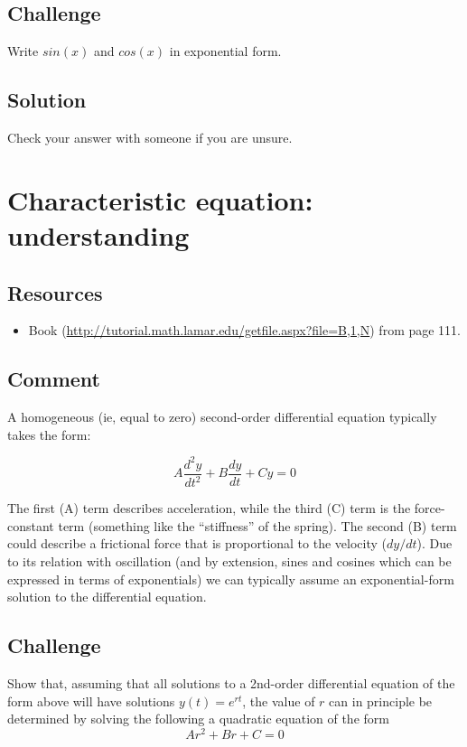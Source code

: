 \subsection*{Challenge}
Write $sin(x)$ and $cos(x)$ in exponential form.

\subsection*{Solution}

Check your answer with someone if you are unsure.


\timebox




\newpage
\section{Characteristic equation: understanding}

\subsection*{Resources}
\begin{itemize}
    \item Book (\url{http://tutorial.math.lamar.edu/getfile.aspx?file=B,1,N}) from page 111.
\end{itemize}

\subsection*{Comment}
A homogeneous (ie, equal to zero) second-order differential equation typically takes the form:

\begin{equation}
    A \frac{d^2y}{dt^2} + B \frac{dy}{dt} + C y = 0
\end{equation}

The first (A) term describes acceleration, while the third (C) term is the force-constant term (something like the ``stiffness'' of the spring). The second (B) term could describe a frictional force that is proportional to the velocity ($dy/dt$). Due to its relation with oscillation (and by extension, sines and cosines which can be expressed in terms of exponentials) we can typically assume an exponential-form solution to the differential equation.

\subsection*{Challenge}
Show that, assuming that all solutions to a 2nd-order differential equation of the form above will have solutions $y(t)=e^{rt}$, the value of $r$ can in principle be determined by solving the following a quadratic equation of the form
\begin{equation}
    A r^2 + Br + C = 0
\end{equation}

